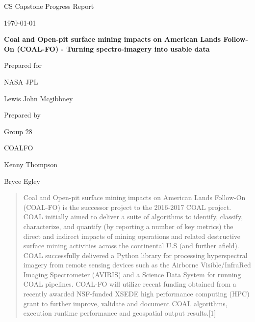 \documentclass[onecolumn, draftclsnofoot,10pt, compsoc]{IEEEtran}
\def \CapstoneTeamName{		COALFO}
\def \CapstoneTeamNumber{		28}
\def \GroupMemberOne{			Kenny Thompson}
\def \GroupMemberTwo{			Bryce Egley}
\def \CapstoneProjectName{		Coal and Open-pit surface mining impacts on American Lands Follow-On (COAL-FO) - Turning spectro-imagery into usable data}
\def \CapstoneSponsorCompany{	NASA JPL}
\def \CapstoneSponsorPerson{		Lewis John Mcgibbney}
\def \DocType{	%
				Progress Report
				}
\newcommand{\NameSigPair}[1]{\par
\makebox[2.75in][r]{#1} \hfil 	\makebox[3.25in]{\makebox[2.25in]{\hrulefill} \hfill		\makebox[.75in]{\hrulefill}}
\par\vspace{-12pt} \textit{\tiny\noindent
\makebox[2.75in]{} \hfil		\makebox[3.25in]{\makebox[2.25in][r]{Signature} \hfill	\makebox[.75in][r]{Date}}}}
\renewcommand{\NameSigPair}[1]{#1}
\begin{document}
\begin{titlepage}
    \begin{singlespace}
        \hfill
        \par\vspace{.2in}
        \centering
        \scshape{
            \huge CS Capstone \DocType \par
            {\large\today}\par
            \vspace{.5in}
            \textbf{\Huge\CapstoneProjectName}\par
            \vfill
            {\large Prepared for}\par
            \Huge \CapstoneSponsorCompany\par
            \vspace{5pt}
            {\Large\NameSigPair{\CapstoneSponsorPerson}\par}
            {\large Prepared by }\par
            Group\CapstoneTeamNumber\par
            \CapstoneTeamName\par
            \vspace{5pt}
            {\Large
                \NameSigPair{\GroupMemberOne}\par
                \NameSigPair{\GroupMemberTwo}\par
            }
            \vspace{20pt}
        }
        \begin{abstract}
        	Coal and Open-pit surface mining impacts on American Lands Follow-On (COAL-FO) is the successor 				project to the 2016-2017 COAL project. COAL initially aimed to deliver a suite of algorithms to identify, classify, characterize, and quantify (by reporting a number of key metrics) the direct and indirect impacts of mining operations and related destructive surface mining activities across the continental U.S (and further afield). COAL successfully delivered a Python library for processing hyperspectral imagery from remote sensing devices such as the Airborne Visible/InfraRed Imaging Spectrometer (AVIRIS) and a Science Data System for running COAL pipelines. COAL-FO will utilize recent funding obtained from a recently awarded NSF-funded XSEDE high performance computing (HPC) grant to further improve, validate and document COAL algorithms, execution runtime performance and geospatial output results.[1]
        \end{abstract}
    \end{singlespace}
\end{titlepage}
\newpage
{}
\tableofcontents
\clearpage
\end{document}
